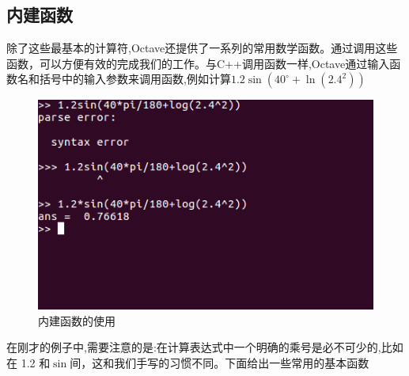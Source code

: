 \documentclass[a4paper,11pt]{ctexart}
\begin{document}
\subsection{内建函数}
除了这些最基本的计算符,Octave还提供了一系列的常用数学函数。通过调用这些函数，可以方便有效的完成我们的工作。与C++调用函数一样,Octave通过输入函数名和括号中的输入参数来调用函数,例如计算$1.2\sin(40^{\circ}+\ln(2.4^2))$\\                       
\begin{figure}[H]
	\begin{center}
		\includegraphics[width=.9\textwidth]{sinlog.png}
	\end{center}
	\caption{内建函数的使用}
\end{figure}
在刚才的例子中,需要注意的是:在计算表达式中一个明确的乘号是必不可少的,比如在 1.2 和$\sin$间，这和我们手写的习惯不同。下面给出一些常用的基本函数
\end{document}

